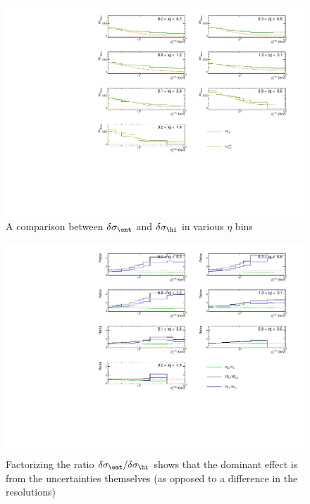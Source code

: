     \begin{figure}
        \centering
        \includegraphics[width=1\textwidth]{figures/qualification/meth2_jer_uncert}
		\caption{A comparison between $\delta\sigma_\emt$ and $\delta\sigma_\hi$ in various $\eta$ bins}
		\label{fig:meth2_jer_uncert}
\end{figure}



\begin{figure}
        \centering
        \includegraphics[width=1\textwidth]{figures/qualification/meth2_ratios}
		\caption{Factorizing the ratio $\delta\sigma_\emt / \delta\sigma_\hi$ shows that the dominant effect is from the uncertainties themselves (as opposed to a difference in the resolutions)}
		\label{fig:meth2_ratios}
    \end{figure}%

